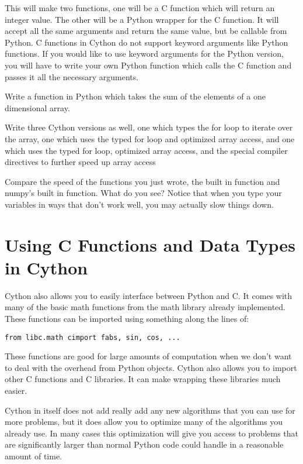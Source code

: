 This will make two functions, one will be a C function which will return an integer value.
The other will be a Python wrapper for the C function.
It will accept all the same arguments and return the same value, but be callable from Python.
C functions in Cython do not support keyword arguments like Python functions.
If you would like to use keyword arguments for the Python version, you will have to write your own Python function which calls the C function and passes it all the necessary arguments.

\begin{problem}

Write a function in Python which takes the sum of the elements of a one dimensional array.

Write three Cython versions as well, one which types the for loop to iterate over the array, one which uses the typed for loop and optimized array access, and one which uses the typed for loop, optimized array access, and the special compiler directives to further speed up array access

Compare the speed of the functions you just wrote, the built in  function and numpy's built in  function.
What do you see?
Notice that when you type your variables in ways that don't work well, you may actually slow things down.

\end{problem}

\section*{Using C Functions and Data Types in Cython}

Cython also allows you to easily interface between Python and C.
It comes with many of the basic math functions from the math library already implemented.
These functions can be imported using something along the lines of:
\begin{lstlisting}
from libc.math cimport fabs, sin, cos, ...
\end{lstlisting}

These functions are good for large amounts of computation when we don't want to deal with the overhead from Python objects.
Cython also allows you to import other C functions and C libraries.
It can make wrapping these libraries much easier.

Cython in itself does not add really add any new algorithms that you can use for more problems, but it does allow you to optimize many of the algorithms you already use.
In many cases this optimization will give you access to problems that are significantly larger than normal Python code could handle in a reasonable amount of time.

